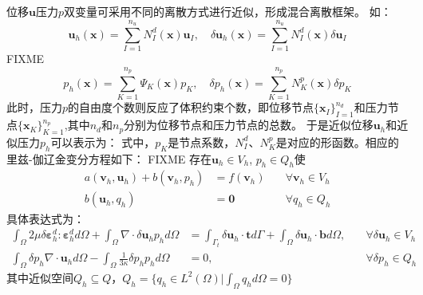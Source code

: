位移$\boldsymbol u$压力$p$双变量可采用不同的离散方式进行近似，形成混合离散框架。
如：
\begin{equation}\label{u_h_mix}
    \boldsymbol u_h(\boldsymbol x) = \sum_{I=1}^{n_u} N^d_I(\boldsymbol x) \boldsymbol u_I, \quad
    \delta \boldsymbol u_h(\boldsymbol x) = \sum_{I=1}^{n_u} N^d_I(\boldsymbol x) \delta \boldsymbol u_I
\end{equation}
FIXME
\begin{equation}\label{p_h_mix}
    p_h(\boldsymbol x) = \sum_{K=1}^{n_p} \Psi_K(\boldsymbol x) p_K, \quad
    \delta p_h(\boldsymbol x) = \sum_{K=1}^{n_p} N^p_K(\boldsymbol x) \delta p_K
\end{equation}
此时，压力$p$的自由度个数则反应了体积约束个数，即位移节点$\{\boldsymbol x_I\}_{I=1}^{n_d}$和压力节点$\{\boldsymbol x_K\}_{K=1}^{n_p}$,其中$n_d$和$n_p$分别为位移节点和压力节点的总数。
于是近似位移$\boldsymbol u_h$和近似压力$p_h$可以表示为：
式中，$p_K$是节点系数，$N^d_I$、$N^p_K$是对应的形函数。相应的里兹-伽辽金变分方程如下：
FIXME
存在$\boldsymbol u_h \in V_h$, $p_h \in Q_h$使
\begin{equation}
    \begin{aligned}
        a(\boldsymbol v_h, \boldsymbol u_h) + b(\boldsymbol v_h, p_h) &= f(\boldsymbol v_h) \quad &\forall \boldsymbol v_h \in V_h \\
        b(\boldsymbol u_h, q_h) &= \boldsymbol 0 \quad &\forall q_h \in Q_h
    \end{aligned}
\end{equation}
具体表达式为：
\begin{subequations}\label{ritz_mix}
\begin{alignat}{2}
\label{ritz_mix_1}
\int_\Omega 2\mu \delta \boldsymbol \varepsilon^d_h : \boldsymbol \varepsilon^d_h d\Omega +
\int_\Omega \nabla \cdot \delta \boldsymbol u_h p_h d\Omega &=
\int_{\Gamma_t} \delta \boldsymbol u_h \cdot \boldsymbol t d\Gamma + \int_\Omega \delta \boldsymbol u_h \cdot \boldsymbol b d\Omega, \quad
&\forall \delta \boldsymbol u_h \in V_h \\
\label{ritz_mix_2}
\int_\Omega \delta p_h \nabla \cdot \boldsymbol u_h d\Omega - \int_\Omega \frac{1}{3\kappa} \delta p_h p_h d\Omega &= 0, &\forall \delta p_h \in Q_h
\end{alignat}
\end{subequations}
其中近似空间$Q_h \subseteq Q$，$Q_h = \{q_h \in L^2(\Omega) \vert \int_{\Omega} q_h d\Omega = 0\}$


